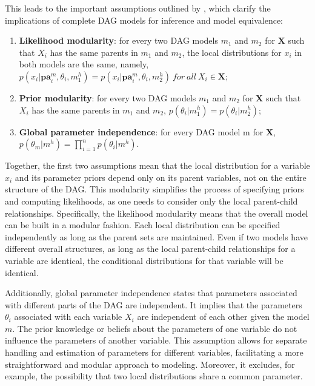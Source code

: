 \documentclass{report}
\begin{document}
This leads to the important assumptions outlined by \citet{geiger2002parameter}, which clarify the implications of complete DAG models for inference and model equivalence:

\begin{enumerate}
	\item \textbf{Likelihood modularity}:  for every two DAG models $m_1$ and $m_2$ for $\mathbf{X}$ such that $X_i$ has the same parents in $m_1$ and $m_2$, the local distributions for $x_i$ in both models are the same, namely, $p(x_i|\mathbf{pa}_i^m,\theta_i, m^h_1) = p(x_i|\mathbf{pa}_i^m,\theta_i, m^h_2) \  for  \ all \  X_i \in \mathbf{X}$;
	\item \textbf{Prior modularity}: for every two DAG models $m_1$ and $m_2$ for $\mathbf{X}$ such that $X_i$ has the same parents in $m_1$ and $m_2$, $p(\theta_i |m_1^h) = p(\theta_i |m_2^h)$; 
	\item \textbf{Global parameter independence}: for every DAG model m for $\mathbf{X}$, $p(\theta_m|m^h)=\prod^n_{i=1}p(\theta_i|m^h)$. 
\end{enumerate}

Together, the first two assumptions mean that the local distribution for a variable $x_i$  and its parameter priors depend only on its parent variables, not on the entire structure of the DAG. This modularity simplifies the process of specifying priors and computing likelihoods, as one needs to consider only the local parent-child relationships. Specifically, the likelihood modularity means that the overall model can be built in a modular fashion. Each local distribution can be specified independently as long as the parent sets are maintained. Even if two models have different overall structures, as long as the local parent-child relationships for a variable are identical, the conditional distributions for that variable will be identical. \hfill \break

Additionally, global parameter independence  states that parameters associated with different parts of the DAG are independent. It implies that the parameters $\theta_i$ associated with each variable  $X_i$  are independent of each other given the model $m$. The prior knowledge or beliefs about the parameters of one variable do not influence the parameters of another variable.
This assumption allows for separate handling and estimation of parameters for different variables, facilitating a more straightforward and modular approach to modeling.
Moreover, it excludes, for example, the possibility that two local distributions share a common parameter. 
\end{document}
